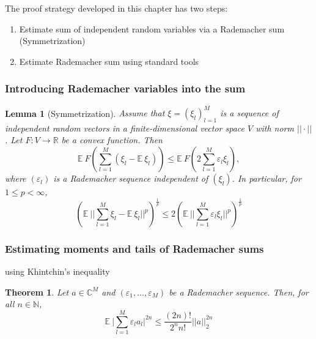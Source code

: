 \documentclass[10pt,a4paper]{article}
\theoremstyle{thmstyle}
\newtheorem{lemma}{Lemma}
\newtheorem{theorem}{Theorem}
\newcommand{\E}{\mathbb{E}~}
\begin{document}
The proof strategy developed in this chapter has two steps:
\begin{enumerate}
\item Estimate sum of independent random variables via a Rademacher sum (Symmetrization)
\item Estimate Rademacher sum using standard tools
\end{enumerate}

\subsubsection{Introducing Rademacher variables into the sum}

\begin{lemma}[Symmetrization]
  Assume that $\xi = (\xi_{l})_{l = 1}^{M}$ is a sequence of independent random vectors in a finite-dimensional vector space $V$ with norm $||\cdot||$.
  Let $F : V \rightarrow \mathbb{R}$ be a convex function.
  Then
  \begin{equation*}
    \E F\left( \sum_{l = 1}^{M} \left( \xi_{l} - \E \xi_{l} \right) \right) \le \E F\left( 2 \sum_{l = 1}^{M} \varepsilon_{l} \xi_{l} \right),
  \end{equation*}
  where $(\varepsilon_{l})$ is a Rademacher sequence independent of $(\xi_{l})$.
  In particular, for $1 \le p < \infty$,
  \begin{equation*}
    \left( \E \Big|\Big| \sum_{l = 1}^{M} \xi_{l} - \E \xi_{l} \Big|\Big|^{p} \right)^{\frac{1}{p}} \le 2 \left( \E \Big|\Big| \sum_{l = 1}^{M} \varepsilon_{l} \xi_{l} \Big|\Big|^{p} \right)^{\frac{1}{p}}
  \end{equation*}
\end{lemma}

\subsubsection{Estimating moments and tails of Rademacher sums}

using Khintchin's inequality

\begin{theorem}
  Let $a \in \mathbb{C}^{M}$ and $(\varepsilon_{1}, \dots, \varepsilon_{M})$ be a Rademacher sequence.
  Then, for all $n \in \mathbb{N}$,
  \begin{equation*}
    \E \Big| \sum_{l = 1}^{M} \varepsilon_{l} a_{l} \Big|^{2n} \le \frac{(2n)!}{2^{n}n!} ||a||_{2}^{2n}
  \end{equation*}
\end{theorem}
\end{document}
